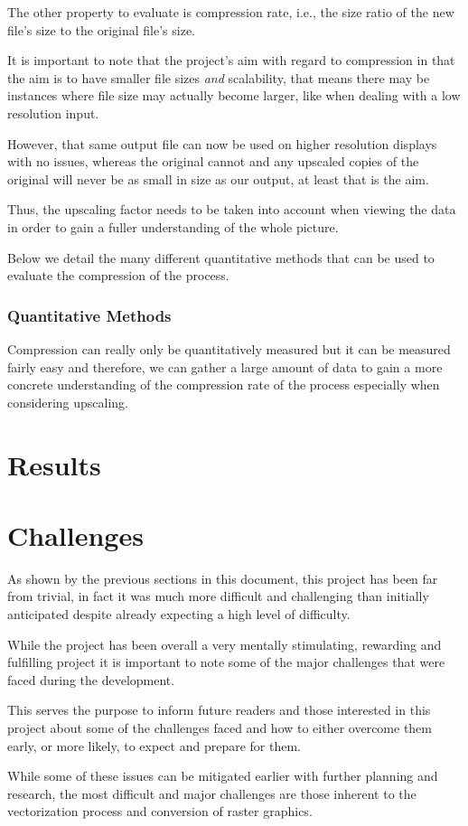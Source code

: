 \documentclass[12pt]{article}
\newcommand{\sentence}{} %
\newcommand{\italic}[1]{\textit{#1}}
\begin{document}
    \tab
    The other property to evaluate is compression rate, i.e., the size ratio of the new file's size to the original
    file's size.
    \sentence
    It is important to note that the project's aim with regard to compression in that the aim is to have smaller file
    sizes \italic{and} scalability, that means there may be instances where file size may actually become larger,
    like when dealing with a low resolution input.
    \sentence
    However, that same output file can now be used on higher resolution displays with no issues, whereas the original
    cannot and any upscaled copies of the original will never be as small in size as our output, at least that is the
    aim.
    \sentence
    Thus, the upscaling factor needs to be taken into account when viewing the data in order to gain a fuller
    understanding of the whole picture.
    \sentence
    Below we detail the many different quantitative methods that can be used to evaluate the compression of the process.

    \subsubsection{Quantitative Methods}\label{subsubsec:quantitative-methods2}

    \tab
    Compression can really only be quantitatively measured but it can be measured fairly easy and therefore, we can
    gather a large amount of data to gain a more concrete understanding of the compression rate of the
    process especially when considering upscaling.
    \sentence

    \pagebreak


    \section{Results}\label{sec:results}

    \pagebreak


    \section{Challenges}\label{sec:challenges}

    \tab
    As shown by the previous sections in this document, this project has been far from trivial, in fact it was much
    more difficult and challenging than initially anticipated despite already expecting a high level of difficulty.
    \sentence
    While the project has been overall a very mentally stimulating, rewarding and fulfilling project it is important
    to note some of the major challenges that were faced during the development.
    \sentence
    This serves the purpose to inform future readers and those interested in this project about some of the
    challenges faced and how to either overcome them early, or more likely, to expect and prepare for them.
    \sentence
    While some of these issues can be mitigated earlier with further planning and research, the most difficult and
    major challenges are those inherent to the vectorization process and conversion of raster graphics.
\end{document}
